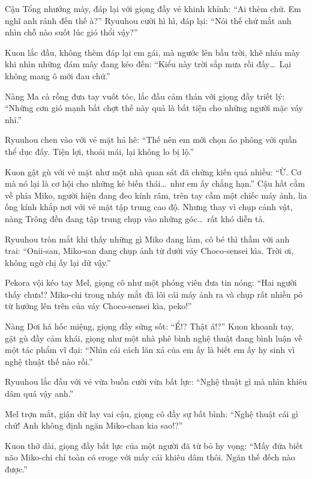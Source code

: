 \documentclass[../main.tex]{subfiles}
\begin{document}
Cậu Tổng nhướng mày, đáp lại với giọng đầy vẻ khinh khỉnh: ``Ai thèm chứ. Em nghĩ anh rảnh đến thế à?'' Ryuuhou cười hì hì, đáp lại: ``Nói thế chứ mắt anh nhìn chỗ nào suốt lúc gió thổi vậy?''

Kuon lắc đầu, không thèm đáp lại em gái, mà ngước lên bầu trời, khẽ nhíu mày khi nhìn những đám mây đang kéo đến: ``Kiểu này trời sắp mưa rồi đấy\dots\ Lại không mang ô mới đau chứ.''

Nàng Ma cà rồng đưa tay vuốt tóc, lắc đầu cảm thán với giọng đầy triết lý: ``Những cơn gió mạnh bất chợt thế này quả là bất tiện cho những người mặc váy nhỉ.''

Ryuuhou chen vào với vẻ mặt hả hê: ``Thế nên em mới chọn áo phông với quần thể dục đấy. Tiện lợi, thoải mái, lại không lo bị lộ.''

Kuon gật gù với vẻ mặt như một nhà quan sát đã chứng kiến quá nhiều: ``Ừ. Cơ mà nó lại là cơ hội cho những kẻ biến thái\dots\ như em ấy chẳng hạn.'' Cậu hất cằm về phía Miko, người hiện đang đeo kính râm, trên tay cầm một chiếc máy ảnh, lia ống kính khắp nơi với vẻ mặt tập trung cao độ. Nhưng thay vì chụp cảnh vật, nàng Trông đền đang tập trung chụp vào những góc\dots\ rất khó diễn tả.


Ryuuhou tròn mắt khi thấy những gì Miko đang làm, cô bé thì thầm với anh trai: ``Onii-san, Miko-san đang chụp ảnh từ dưới váy Choco-sensei kìa. Trời ơi, không ngờ chị ấy lại dữ vậy.''

Pekora vội kéo tay Mel, giọng cô như một phóng viên đưa tin nóng: ``Hai người thấy chưa!? Miko-chi trong nháy mắt đã lôi cái máy ảnh ra và chụp rất nhiều pô từ hướng lên trên của váy Choco-sensei kìa, peko!''

Nàng Dơi há hốc miệng, giọng đầy sửng sốt: ``Ể!? Thật á!?'' Kuon khoanh tay, gật gù đầy cảm khái, giọng như một nhà phê bình nghệ thuật đang bình luận về một tác phẩm vĩ đại: ``Nhìn cái cách lăn xả của em ấy là biết em ấy hy sinh vì nghệ thuật thế nào rồi.''

Ryuuhou lắc đầu với vẻ vừa buồn cười vừa bất lực: ``Nghệ thuật gì mà nhìn khiêu dâm quá vậy anh.''

Mel trợn mắt, giận dữ lay vai cậu, giọng cô đầy sự bất bình: ``Nghệ thuật cái gì chứ! Anh không định ngăn Miko-chan kia sao!?''

Kuon thở dài, giọng đầy bất lực của một người đã từ bỏ hy vọng: ``Mấy đứa biết não Miko-chi chỉ toàn có eroge với mấy cái khiêu dâm thôi. Ngăn thế đếch nào được.''
\end{document}
